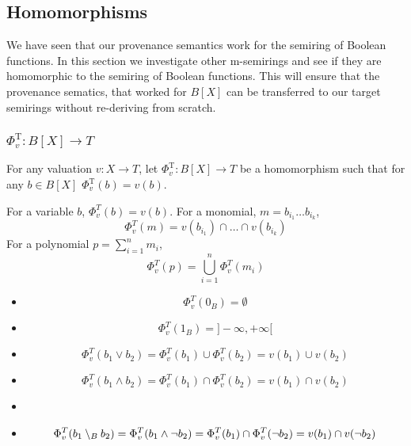\subsection{Homomorphisms}
We have seen that our provenance semantics work for 
the semiring of Boolean functions. In this section we investigate other m-semirings and see if they are homomorphic 
to the semiring of Boolean functions. This will ensure that the provenance sematics, that worked for $B[X]$ can be transferred to 
our target semirings without re-deriving from scratch.


\subsubsection{$\Phi^{\mathrm{T}}_v : B[X] \to T$}
For any valuation $v:X \to T$, let $\Phi^{\mathrm{T}}_v : B[X] \to T$ be a homomorphism such that for any $b\in B[X]$ 
$\Phi^{\mathrm{T}}_v(b)=v(b)$.

For a variable $b$, $\Phi_v^T(b) = v(b)$.
For a monomial, $m = b_{i_1}\dots b_{i_k}$,
$$\Phi_v^T(m) = v(b_{i_1}) \cap \dots \cap v(b_{i_k})$$
For a polynomial $p = \sum_{i=1}^n m_i$,
$$\Phi_v^T(p) = \bigcup_{i=1}^n \Phi_v^T(m_i)$$
\begin{itemize}
    \item $$\Phi_v^T(0_{B}) = \emptyset$$
    \item $$\Phi_v^T(1_{B}) = ]-\infty, +\infty[$$
    \item $$\Phi_v^T(b_1 \vee b_2) = \Phi_v^T(b_1) \cup \Phi_v^T(b_2) = v(b_1)\cup v(b_2)$$
    \item $$\Phi_v^T(b_1 \wedge b_2) = \Phi_v^T(b_1) \cap \Phi_v^T(b_2) = v(b_1)\cap v(b_2)$$
    \item \item $$\Phi_v^T(b_1 \setminus_B b_2) = \Phi_v^T(b_1 \wedge \neg b_2) = \Phi_v^T(b_1)\cap \Phi_v^T(\neg b_2)\\
    = v(b_1)\cap v(\neg b_2)$$
\end{itemize}

